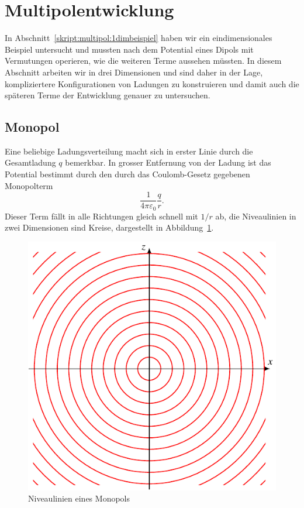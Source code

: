 %
%
%
\section{Multipolentwicklung}
In Abschnitt~\ref{skript:multipol:1dimbeispiel} haben wir ein
eindimensionales Beispiel untersucht und mussten nach dem Potential
eines Dipols mit Vermutungen operieren, wie die weiteren Terme aussehen
müssten.
In diesem Abschnitt arbeiten wir in drei Dimensionen und sind daher
in der Lage, kompliziertere Konfigurationen von Ladungen zu
konstruieren und damit auch die späteren Terme der Entwicklung
genauer zu untersuchen.

\subsection{Monopol}
%
Eine beliebige Ladungsverteilung macht sich in erster Linie durch
die Gesamtladung $q$ bemerkbar.
In grosser Entfernung von der Ladung ist das Potential bestimmt durch
den durch das Coulomb-Gesetz gegebenen Monopolterm
\[
\frac{1}{4\pi\varepsilon_0}\frac{q}{r}.
\]
Dieser Term fällt in alle Richtungen gleich schnell mit $1/r$ ab,
die Niveaulinien in zwei Dimensionen sind Kreise, dargestellt in
Abbildung~\ref{skript:multipol:monopol}.
\begin{figure}
\centering
\includegraphics{chapters/tikz/monopol.pdf}
\caption{Niveaulinien eines Monopols%
\label{skript:multipol:monopol}}
\end{figure}

